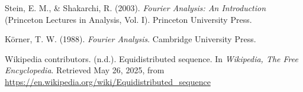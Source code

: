 \documentclass[12pt]{article}
\begin{document}
\begin{thebibliography}{9}

Stein, E. M., \& Shakarchi, R. (2003). \textit{Fourier Analysis: An Introduction} (Princeton Lectures in Analysis, Vol. I). Princeton University Press.

Körner, T. W. (1988). \textit{Fourier Analysis}. Cambridge University Press.

Wikipedia contributors. (n.d.). Equidistributed sequence. In \textit{Wikipedia, The Free Encyclopedia}. Retrieved May 26, 2025, from \url{https://en.wikipedia.org/wiki/Equidistributed_sequence}

\end{thebibliography}
\end{document}
